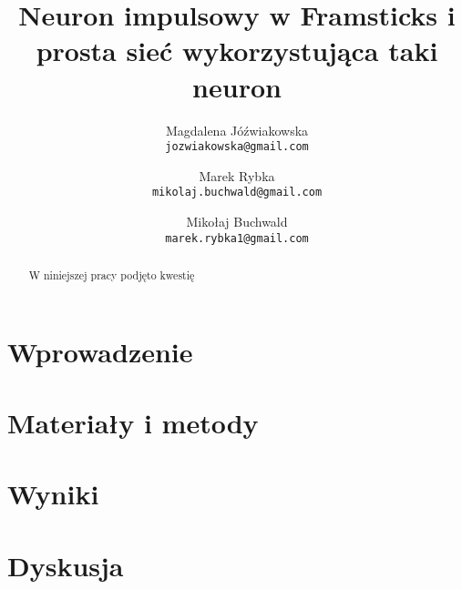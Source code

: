\documentclass{article}
\date{}
\author{
Magdalena Jóźwiakowska\\\texttt{jozwiakowska@gmail.com}
\and
Marek Rybka\\\texttt{mikolaj.buchwald@gmail.com}
\and
Mikołaj Buchwald\\\texttt{marek.rybka1@gmail.com}
}
\title{Neuron impulsowy w Framsticks i prosta sieć wykorzystująca taki neuron}
\begin{document}
\maketitle

\begin{abstract}
    W niniejszej pracy podjęto kwestię 
\end{abstract}

\newpage
\section{Wprowadzenie}

\newpage
\section{Materiały i metody}

\newpage
\section{Wyniki}

\newpage
\section{Dyskusja}
\end{document}
